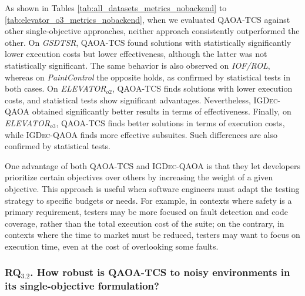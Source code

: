 As shown in Tables \ref{tab:all_datasets_metrics_nobackend} to \ref{tab:elevator_o3_metrics_nobackend}, when we evaluated \textsc{QAOA-TCS} against other single-objective approaches, neither approach consistently outperformed the other.
On \textit{GSDTSR}, \textsc{QAOA-TCS} found solutions with statistically significantly lower execution costs but lower effectiveness, although the latter was not statistically significant. The same behavior is also observed on \textit{IOF/ROL}, whereas on \textit{PaintControl} the opposite holds, as confirmed by statistical tests in both cases.
On \textit{ELEVATOR$_{o2}$}, \textsc{QAOA-TCS} finds solutions with lower execution costs, and statistical tests show significant advantages. Nevertheless, \textsc{IGDec-QAOA} obtained significantly better results in terms of effectiveness.
Finally, on \textit{ELEVATOR$_{o3}$}, \textsc{QAOA-TCS} finds better solutions in terms of execution costs, while \textsc{IGDec-QAOA} finds more effective subsuites. Such differences are also confirmed by statistical tests.

One advantage of both \textsc{QAOA-TCS} and \textsc{IGDec-QAOA} is that they let developers prioritize certain objectives over others by increasing the weight of a given objective. This approach is useful when software engineers must adapt the testing strategy to specific budgets or needs. For example, in contexts where safety is a primary requirement, testers may be more focused on fault detection and code coverage, rather than the total execution cost of the suite; on the contrary, in contexts where the time to market must be reduced, testers may want to focus on execution time, even at the cost of overlooking some faults.


\subsubsection{RQ$_{3.2}$. How robust is QAOA-TCS to noisy environments in its single-objective formulation?}

